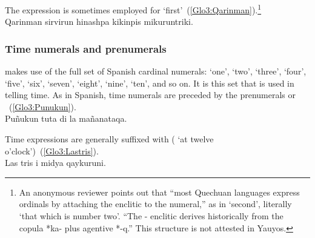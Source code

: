\noindent
The expression  is sometimes employed for ‘first’~(\ref{Glo3:Qarinman}).\footnote{An anonymous reviewer points out that “most Quechuan languages express ordinals by attaching the enclitic  to the numeral,” as in  ‘second’, literally ‘that which is number two’. “The - enclitic derives historically from the copula *ka- plus agentive *-q.” This structure is not attested in Yauyos.}\\

%
{Qarinman sirvirun  hinashpa kikinpis mikuruntriki.}%
{}%
{}{}%

\subsubsection{Time numerals and prenumerals}\label{ssec:timenum}
\SYQ{} makes use of the full set of Spanish cardinal numerals:  ‘one’,  ‘two’,  ‘three’,  ‘four’,  ‘five’,  ‘six’,  ‘seven’,  ‘eight’,  ‘nine’,  ‘ten’, and so on. It is this set that is used in telling time. As in Spanish, time numerals are preceded by the prenumerals  or ~(\ref{Glo3:Punukun}).\\

%
{Puñukun tuta  di la mañanataqa.}%
{}%
{}{}%

\noindent
Time expressions are generally suffixed with  ( ‘at twelve o’clock’)~(\ref{Glo3:Lastris}).\\

%
{Las tris i midya qaykuruni.}%
{}%
{}{}%

